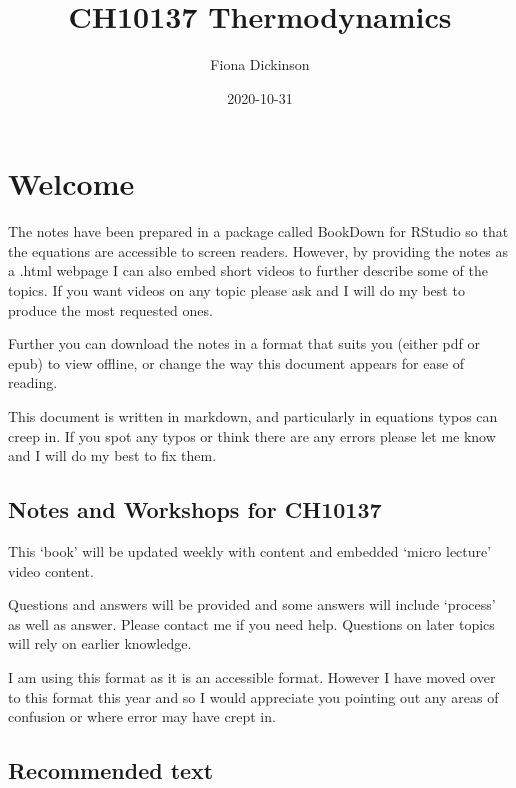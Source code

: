 \documentclass[
]{book}
\title{CH10137 Thermodynamics}
\author{Fiona Dickinson}
\date{2020-10-31}
\begin{document}
\maketitle

{
\setcounter{tocdepth}{1}
\tableofcontents
}
\hypertarget{welcome}{%
\chapter*{Welcome}\label{welcome}}

The notes have been prepared in a package called BookDown for RStudio so that the equations are accessible to screen readers. However, by providing the notes as a .html webpage I can also embed short videos to further describe some of the topics. If you want videos on any topic please ask and I will do my best to produce the most requested ones.

Further you can download the notes in a format that suits you (either pdf or epub) to view offline, or change the way this document appears for ease of reading.

This document is written in markdown, and particularly in equations typos can creep in. If you spot any typos or think there are any errors please let me know and I will do my best to fix them.

\hypertarget{notes-and-workshops-for-ch10137}{%
\section*{Notes and Workshops for CH10137}\label{notes-and-workshops-for-ch10137}}

This `book' will be updated weekly with content and embedded `micro lecture' video content.

Questions and answers will be provided and some answers will include `process' as well as answer. Please contact me if you need help. Questions on later topics will rely on earlier knowledge.

I am using this format as it is an accessible format. However I have moved over to this format this year and so I would appreciate you pointing out any areas of confusion or where error may have crept in.

\hypertarget{recommended-text}{%
\section*{Recommended text}\label{recommended-text}}
\end{document}
